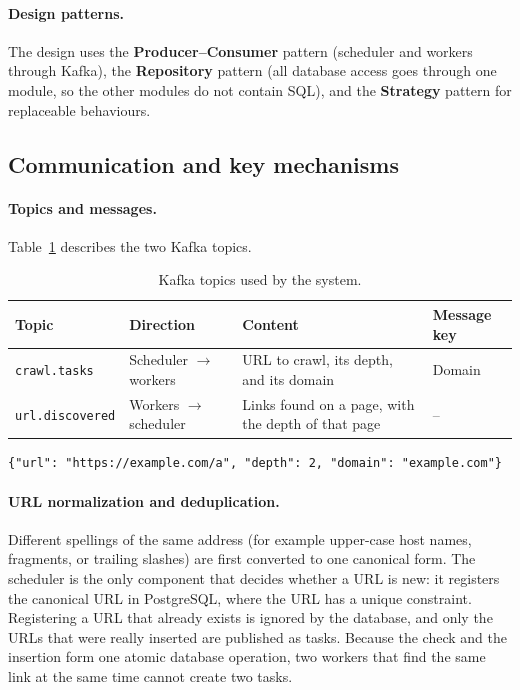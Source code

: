 \paragraph{Design patterns.} The design uses the \textbf{Producer--Consumer} pattern (scheduler and workers through Kafka), the \textbf{Repository} pattern (all database access goes through one module, so the other modules do not contain SQL), and the \textbf{Strategy} pattern for replaceable behaviours.




\subsection{Communication and key mechanisms}
\paragraph{Topics and messages.} Table~\ref{tab:topics} describes the two Kafka topics.

\begin{table}[H]
\centering
\begin{tabular}{|p{2.8cm}|p{3.0cm}|p{4.4cm}|p{2.5cm}|}
\hline
\textbf{Topic} & \textbf{Direction} & \textbf{Content} & \textbf{Message key} \\
\hline
\texttt{crawl.tasks} & Scheduler $\rightarrow$ workers & URL to crawl, its depth, and its domain & Domain \\
\hline
\texttt{url.discovered} & Workers $\rightarrow$ scheduler & Links found on a page, with the depth of that page & -- \\
\hline
\end{tabular}
\caption{Kafka topics used by the system.}
\label{tab:topics}
\end{table}

\begin{verbatim}
{"url": "https://example.com/a", "depth": 2, "domain": "example.com"}
\end{verbatim}

\paragraph{URL normalization and deduplication.} Different spellings of the same address (for example upper-case host names, fragments, or trailing slashes) are first converted to one canonical form. The scheduler is the only component that decides whether a URL is new: it registers the canonical URL in PostgreSQL, where the URL has a unique constraint. Registering a URL that already exists is ignored by the database, and only the URLs that were really inserted are published as tasks. Because the check and the insertion form one atomic database operation, two workers that find the same link at the same time cannot create two tasks.

